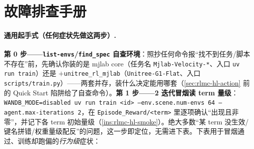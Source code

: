\section*{故障排查手册}

\paragraph{通用起手式（任何症状先做这两步）.}
\textbf{第 0 步——\texttt{list-envs}/\texttt{find\_spec} 自查环境}：照抄任何命令报“找不到任务/脚本不存在”前，先确认你装的是 mjlab core（任务名 \texttt{Mjlab-Velocity-*}、入口 \texttt{uv run train}）还是 $+$\texttt{unitree\_rl\_mjlab}（\texttt{Unitree-G1-Flat}、入口 \texttt{scripts/train.py}）——两套并存，装什么决定能用哪套（\cref{sec:rlmc-hl-action} 前的 Quick Start 陷阱给了自查命令）。\textbf{第 1 步——2 迭代冒烟读 term 量级}：\texttt{WANDB\_MODE=disabled uv run train <id> --env.scene.num-envs 64 --agent.max-iterations 2}，在 \texttt{Episode\_Reward/<term>} 里逐项确认“出现且非零”，并记下各 term 初始量级（\cref{ins:rlmc-hl-smoke}）。绝大多数“某 term 没生效/键名拼错/权重量级配反”的问题，这一步即定位，无需进下表。下表用于冒烟通过、训练却跑偏的\emph{行为级}症状：

